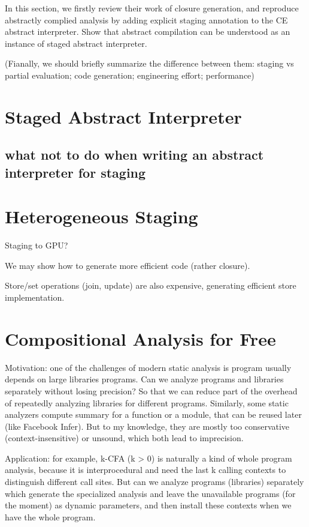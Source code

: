 \documentclass[sigplan,anonymous,review]{acmart}
\begin{document}
In this section, we firstly review their work of closure generation, and reproduce abstractly complied analysis
by adding explicit staging annotation to the CE abstract interpreter.
Show that abstract compilation can be understood as an instance of staged 
abstract interpreter.

(Fianally, we should briefly summarize the difference between them:
staging vs partial evaluation; code generation; engineering effort; performance)

\section{Staged Abstract Interpreter}

\subsection{what not to do when writing an abstract interpreter for staging}

\section{Heterogeneous Staging}

Staging to GPU?

We may show how to generate more efficient code (rather closure).

Store/set operations (join, update) are also expensive, generating efficient store
implementation\cite{liang2014fast}.

\section{Compositional Analysis for Free}

Motivation: one of the challenges of modern static analysis is program usually depends on
large libraries programs\cite{toman_et_al:LIPIcs:2017:7121}. 
Can we analyze programs and libraries separately without losing precision? So that we can 
reduce part of the overhead of repeatedly analyzing libraries for different programs.
Similarly, some static analyzers compute summary for a function or a module, that can be reused
later (like Facebook Infer). But to my knowledge, they are mostly too conservative (context-insensitive) 
or unsound, which both lead to imprecision.

Application: for example, k-CFA (k > 0) is naturally a kind of whole program analysis,
because it is interprocedural and need the last k calling contexts to distinguish
different call sites.
But can we analyze programs (libraries) separately which generate the specialized 
analysis and leave the unavailable programs (for the moment) as dynamic parameters, 
and then install these contexts when we have the whole program.
\end{document}

